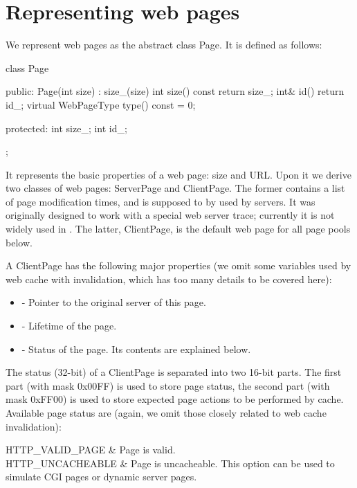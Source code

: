 \section{Representing web pages}

We represent web pages as the abstract class Page. It is defined as follows:

\begin{program}
class Page {
public:
        Page(int size) : size_(size) {}
        int size() const { return size_; }
        int& id() { return id_; }
        virtual WebPageType type() const = 0;

protected:
        int size_;
        int id_;
};
\end{program}

It represents the basic properties of a web page: size and URL. Upon
it we derive two classes of web pages: ServerPage and ClientPage. The
former contains a list of page modification times, and is supposed to
by used by servers. It was originally designed to work with a special
web server trace; currently it is not widely used in \ns. The latter,
ClientPage, is the default web page for all page pools below. 

A ClientPage has the following major properties (we omit some
variables used by web cache with invalidation, which has too many
details to be covered here):

\begin{itemize}
\item {} - Pointer to the original server of this
  page. 
\item {} - Lifetime of the page.
\item {} - Status of the page. Its contents are
  explained below.
\end{itemize}

The status (32-bit) of a ClientPage is separated into two 16-bit
parts. The first part (with mask 0x00FF) is used to store page
status, the second part (with mask 0xFF00) is used to store expected
page actions to be performed by cache. Available page status are (again,
we omit those closely related to web cache invalidation):

\begin{alist}
HTTP\_VALID\_PAGE & Page is valid. \\
HTTP\_UNCACHEABLE & Page is uncacheable. This option can be used to
simulate CGI pages or dynamic server pages. \\
\end{alist}

